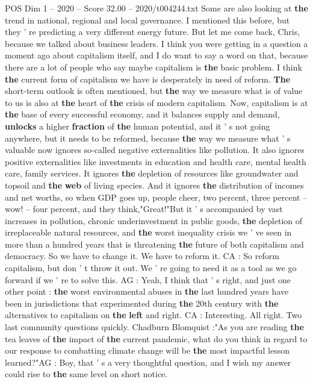 \begin{textsample}{POS Dim 1 – 2020 – Score 32.00 – 2020/t004244.txt}
Some are also looking at \textbf{the} trend in national, regional and local governance.
I mentioned this before, but they ' re predicting a very different energy future.
But let me come back, Chris, because we talked about business leaders.
I think you were getting in a question a moment ago about capitalism itself, and I do want to say a word on that, because there are a lot of people who say maybe capitalism is \textbf{the} basic problem.
I think \textbf{the} current form of capitalism we have is desperately in need of reform. \textbf{The} short-term outlook is often mentioned, but \textbf{the} way we measure what is of value to us is also at \textbf{the} heart of \textbf{the} crisis of modern capitalism.
Now, capitalism is at \textbf{the} base of every successful economy, and it balances supply and demand, \textbf{unlocks} a higher \textbf{fraction} of \textbf{the} human potential, and it ' s not going anywhere, but it needs to be reformed, because \textbf{the} way we measure what ' s valuable now ignores so-called negative externalities like pollution.
It also ignores positive externalities like investments in education and health care, mental health care, family services.
It ignores \textbf{the} depletion of resources like groundwater and topsoil and \textbf{the} \textbf{web} of living species.
And it ignores \textbf{the} distribution of incomes and net worths, so when GDP goes up, people cheer, two percent, three percent -- wow! -- four percent, and they think,"Great!"But it ' s accompanied by vast increases in pollution, chronic underinvestment in public goods, \textbf{the} depletion of irreplaceable natural resources, and \textbf{the} worst inequality crisis we ' ve seen in more than a hundred years that is threatening \textbf{the} future of both capitalism and democracy.
So we have to change it.
We have to reform it.
CA : So reform capitalism, but don ' t throw it out.
We ' re going to need it as a tool as we go forward if we ' re to solve this.
AG : Yeah, I think that ' s right, and just one other point : \textbf{the} worst environmental abuses in \textbf{the} last hundred years have been in jurisdictions that experimented during \textbf{the} 20th century with \textbf{the} alternatives to capitalism on \textbf{the} \textbf{left} and right.
CA : Interesting.
All right.
Two last community questions quickly.
Chadburn Blomquist :"As you are reading \textbf{the} tea leaves of \textbf{the} impact of \textbf{the} current pandemic, what do you think in regard to our response to combatting climate change will be \textbf{the} most impactful lesson learned?"AG : Boy, that ' s a very thoughtful question, and I wish my answer could rise to \textbf{the} same level on short notice.

\end{textsample}
